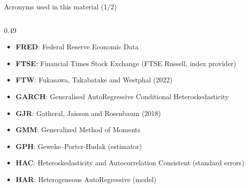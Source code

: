 \begin{frame}{Acronyms used in this material (1/2)}
\begin{columns}[T]
\begin{column}{0.49\textwidth}
\begin{itemize}
    \item \textbf{FRED}: Federal Reserve Economic Data
    \item \textbf{FTSE}: Financial Times Stock Exchange (FTSE Russell, index provider)
    \item \textbf{FTW}: Fukasawa, Takabatake and Westphal (2022)
    \item \textbf{GARCH}: Generalised AutoRegressive Conditional Heteroskedasticity
    \item \textbf{GJR}: Gatheral, Jaisson and Rosenbaum (2018)
    \item \textbf{GMM}: Generalized Method of Moments
    \item \textbf{GPH}: Geweke–Porter-Hudak (estimator)
    \item \textbf{HAC}: Heteroskedasticity and Autocorrelation Consistent (standard errors)
    \item \textbf{HAR}: Heterogeneous AutoRegressive (model)
\end{itemize}
\end{column}
\end{columns}
\end{frame}
